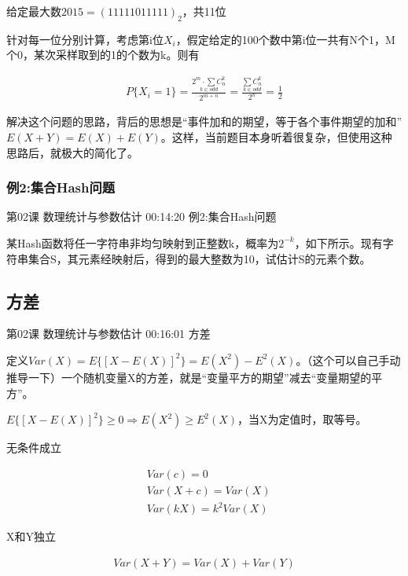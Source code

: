\documentclass[UTF8]{ctexbook}
\begin{document}
给定最大数$2015=(11111011111)_{2}$，共11位

针对每一位分别计算，考虑第i位$X_{i}$，假定给定的100个数中第i位一共有N个1，M个0，某次采样取到的1的个数为k。则有

\begin{equation}
\begin{aligned}
P\{X_{i}=1\}=\frac{\underset{k \in odd}{2^{m} \cdot \sum C_{n}^{k}}}{2^{m+n}}
=\frac{\underset{k \in odd}{\sum C_{n}^{k}}}{2^{n}}
=\frac{1}{2}
\end{aligned}
\end{equation}

解决这个问题的思路，背后的思想是“事件加和的期望，等于各个事件期望的加和”$E(X+Y)=E(X)+E(Y)$。这样，当前题目本身听着很复杂，但使用这种思路后，就极大的简化了。

\subsubsection{例2:集合Hash问题}

第02课 数理统计与参数估计 00:14:20 例2:集合Hash问题

某Hash函数将任一字符串非均匀映射到正整数k，概率为$2^{-k}$，如下所示。现有字符串集合S，其元素经映射后，得到的最大整数为10，试估计S的元素个数。

\subsection{方差}

第02课 数理统计与参数估计 00:16:01 方差

定义$Var(X)=E\{  [X-E(X)]^{2} \}=E(X^{2})-E^{2}(X)$。（这个可以自己手动推导一下）一个随机变量X的方差，就是“变量平方的期望”减去“变量期望的平方”。

$E\{  [X-E(X)]^{2} \} \geq 0 \Rightarrow E(X^{2}) \geq E^{2}(X)$，当X为定值时，取等号。

无条件成立

\begin{equation}
\begin{aligned}
&Var(c)=0 \\
&Var(X+c)=Var(X)\\
&Var(kX)=k^{2}Var(X)
\end{aligned}
\end{equation}

X和Y独立

\begin{equation}
\begin{aligned}
Var(X+Y)=Var(X)+Var(Y)
\end{aligned}
\end{equation}
\end{document}
